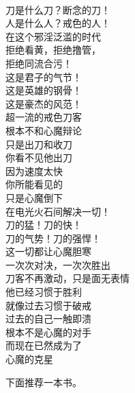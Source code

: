 \begin{poem}[戒色悍刀行]
    \begin{multicols}{3}
        \centering~\\
        刀是什么刀？断念的刀！ \\ 人是什么人？戒色的人！ \\ 在这个邪淫泛滥的时代 \\ 拒绝看黄，拒绝撸管， \\ 拒绝同流合污！ \\ 这是君子的气节！ \\ 这是英雄的钢骨！ \\ 这是豪杰的风范！ \\ 超一流的戒色刀客 \\ 根本不和心魔辩论 \\ 只是出刀和收刀 \\ 你看不见他出刀 \\ 因为速度太快 \\ 你所能看见的 \\ 只是心魔倒下 \\ 在电光火石间解决一切！ \\ 刀的猛！刀的快！ \\ 刀的气势！刀的强悍！ \\ 这一切都让心魔胆寒 \\ 一次次对决，一次次胜出 \\ 刀客不再激动，只是面无表情 \\ 他已经习惯于胜利 \\ 就像过去习惯于破戒 \\ 过去的自己一触即溃 \\ 根本不是心魔的对手 \\ 而现在已然成为了 \\ 心魔的克星
    \end{multicols}
\end{poem}

下面推荐一本书。

